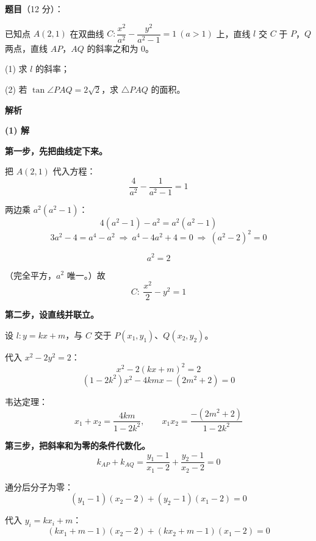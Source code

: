 \begin{answer}

\textbf{题目}（12 分）：

已知点 $A(2,1)$ 在双曲线 $C:\dfrac{x^{2}}{a^{2}}-\dfrac{y^{2}}{a^{2}-1}=1\ (a>1)$ 上，直线 $l$ 交 $C$ 于 $P$，$Q$ 两点，直线 $AP$，$AQ$ 的斜率之和为 $0$。

  (1) 求 $l$ 的斜率；

  (2) 若 $\tan\angle PAQ=2\sqrt2$，求 $\triangle PAQ$ 的面积。

\textbf{解析}

\par\medskip

\textbf{(1) 解}

\textbf{第一步，先把曲线定下来。}

把 $A(2,1)$ 代入方程：
\nopagebreak[4]
\[\frac4{a^{2}}-\frac1{a^{2}-1}=1\]

两边乘 $a^{2}\left(a^{2}-1\right)$：
\nopagebreak[4]
\[4\left(a^{2}-1\right)-a^{2}=a^{2}\left(a^{2}-1\right)\]
\nopagebreak[4]
\[3a^{2}-4=a^{4}-a^{2}\ \Longrightarrow\ a^{4}-4a^{2}+4=0\ \Longrightarrow\ \left(a^{2}-2\right)^{2}=0\]

\nopagebreak[4]
\[a^{2}=2\]

（完全平方，$a^2$ 唯一。）故
\nopagebreak[4]
\[C:\ \frac{x^{2}}2-y^{2}=1\]

\textbf{第二步，设直线并联立。}

设 $l:y=kx+m$，与 $C$ 交于 $P\left(x_1,y_1\right)$、$Q\left(x_2,y_2\right)$。

代入 $x^{2}-2y^{2}=2$：
\nopagebreak[4]
\[x^{2}-2(kx+m)^{2}=2\]
\nopagebreak[4]
\[\left(1-2k^{2}\right)x^{2}-4kmx-\left(2m^{2}+2\right)=0\]

韦达定理：
\nopagebreak[4]
\[x_1+x_2=\frac{4km}{1-2k^{2}},\qquad x_1x_2=\frac{-\left(2m^{2}+2\right)}{1-2k^{2}}\]

\textbf{第三步，把斜率和为零的条件代数化。}
\nopagebreak[4]
\[k_{AP}+k_{AQ}=\frac{y_1-1}{x_1-2}+\frac{y_2-1}{x_2-2}=0\]

通分后分子为零：
\nopagebreak[4]
\[\left(y_1-1\right)\left(x_2-2\right)+\left(y_2-1\right)\left(x_1-2\right)=0\]

代入 $y_i=kx_i+m$：
\nopagebreak[4]
\[\left(kx_1+m-1\right)\left(x_2-2\right)+\left(kx_2+m-1\right)\left(x_1-2\right)=0\]


\end{answer}
